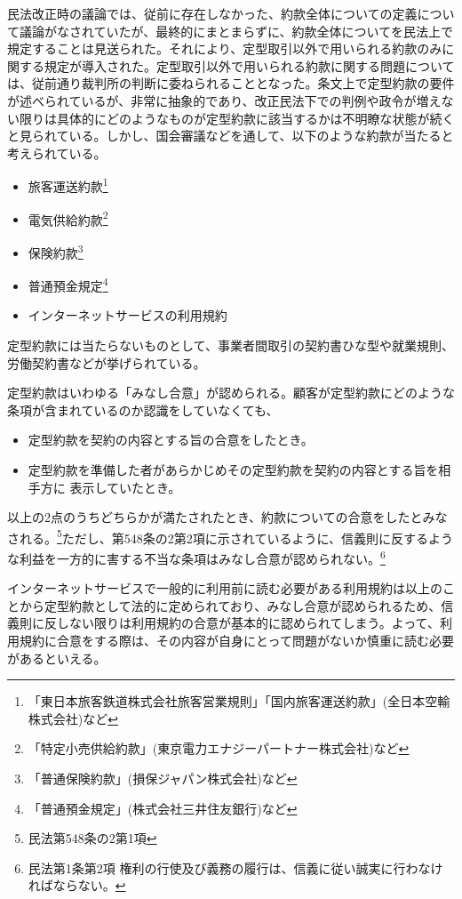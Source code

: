 民法改正時の議論では、従前に存在しなかった、約款全体についての定義について議論がなされていたが、最終的にまとまらずに、約款全体についてを民法上で規定することは見送られた。それにより、定型取引以外で用いられる約款のみに関する規定が導入された。定型取引以外で用いられる約款に関する問題については、従前通り裁判所の判断に委ねられることとなった。\cite{国民生活no89}条文上で定型約款の要件が述べられているが、非常に抽象的であり、改正民法下での判例や政令が増えない限りは具体的にどのようなものが定型約款に該当するかは不明瞭な状態が続くと見られている。しかし、国会審議などを通して、以下のような約款が当たると考えられている。\cite{改正民法の定型約23:online}
\begin{itemize}
  \item 旅客運送約款\footnote{「東日本旅客鉄道株式会社旅客営業規則」「国内旅客運送約款」(全日本空輸株式会社)など}
  \item 電気供給約款\footnote{「特定小売供給約款」(東京電力エナジーパートナー株式会社)など}
  \item 保険約款\footnote{「普通保険約款」(損保ジャパン株式会社)など}
  \item 普通預金規定\footnote{「普通預金規定」(株式会社三井住友銀行)など}
  \item インターネットサービスの利用規約
\end{itemize}
定型約款には当たらないものとして、事業者間取引の契約書ひな型や就業規則、労働契約書などが挙げられている。

定型約款はいわゆる「みなし合意」が認められる。顧客が定型約款にどのような条項が含まれているのか認識をしていなくても、
\begin{itemize}
  \item 定型約款を契約の内容とする旨の合意をしたとき。
  \item 定型約款を準備した者があらかじめその定型約款を契約の内容とする旨を相手方に
  表示していたとき。
\end{itemize}
以上の2点のうちどちらかが満たされたとき、約款についての合意をしたとみなされる。\footnote{民法第548条の2第1項}ただし、第548条の2第2項に示されているように、信義則に反するような利益を一方的に害する不当な条項はみなし合意が認められない。\footnote{民法第1条第2項 権利の行使及び義務の履行は、信義に従い誠実に行わなければならない。}


インターネットサービスで一般的に利用前に読む必要がある利用規約は以上のことから定型約款として法的に定められており、みなし合意が認められるため、信義則に反しない限りは利用規約の合意が基本的に認められてしまう。よって、利用規約に合意をする際は、その内容が自身にとって問題がないか慎重に読む必要があるといえる。

